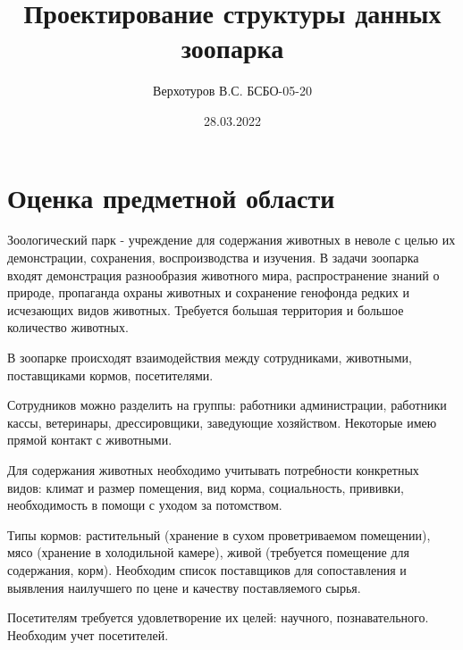 \documentclass{article}
\title{Проектирование структуры данных зоопарка}
\author{Верхотуров В.С. БСБО-05-20}
\date{28.03.2022}
\begin{document}
\maketitle

\section{Оценка предметной области}

Зоологический парк - учреждение для содержания животных в неволе с целью их демонстрации, сохранения, воспроизводства и изучения. В задачи зоопарка входят демонстрация разнообразия животного мира, распространение знаний о природе, пропаганда охраны животных и сохранение генофонда редких и исчезающих видов животных. Требуется большая территория и большое количество животных.

В зоопарке происходят взаимодействия между сотрудниками, животными, поставщиками кормов, посетителями.

Сотрудников можно разделить на группы: работники администрации, работники кассы, ветеринары, дрессировщики, заведующие хозяйством. Некоторые имею прямой контакт с животными.

Для содержания животных необходимо учитывать потребности конкретных видов: климат и размер помещения, вид корма, социальность, прививки, необходимость в помощи с уходом за потомством.

Типы кормов: растительный (хранение в сухом проветриваемом помещении), мясо (хранение в холодильной камере), живой (требуется помещение для содержания, корм). Необходим список поставщиков для сопоставления и выявления наилучшего по цене и качеству поставляемого сырья.

Посетителям требуется удовлетворение их целей: научного, познавательного. Необходим учет посетителей.
\end{document}
